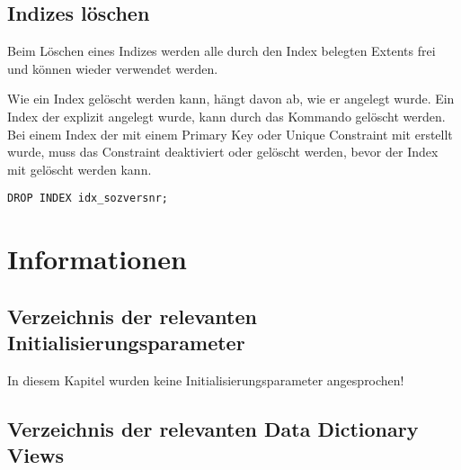       \subsection{Indizes löschen}
        Beim Löschen eines Indizes werden alle durch den Index belegten Extents frei und können wieder verwendet werden.
				
        Wie ein Index gelöscht werden kann, hängt davon ab, wie er angelegt wurde. Ein Index der explizit angelegt wurde, kann durch das Kommando  gelöscht werden. Bei einem Index der mit einem Primary Key oder Unique Constraint mit erstellt wurde, muss das Constraint deaktiviert oder gelöscht werden, bevor der Index mit  gelöscht werden kann.
        \begin{lstlisting}[caption={Einen Index Löschen},label=admin333,language=oracle_sql]
DROP INDEX idx_sozversnr;
        \end{lstlisting}
    \section{Informationen}
      \subsection{Verzeichnis der relevanten Initialisierungsparameter}
        In diesem Kapitel wurden keine Initialisierungsparameter angesprochen!
      \subsection{Verzeichnis der relevanten Data Dictionary Views}
        \begin{literaturinternet}
          \item \cite{sthref2545}
          \item \cite{sthref2528}
          \item \cite{sthref2202}
          \item \cite{sthref2191}
        \end{literaturinternet}
\clearpage
